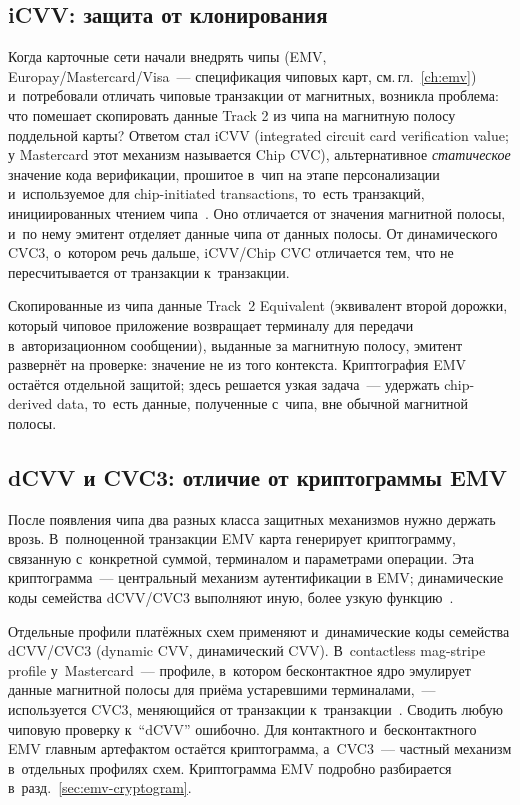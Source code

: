 \subsection*{iCVV: защита от клонирования}

Когда карточные сети начали внедрять чипы (EMV, Europay/Mastercard/Visa~---
спецификация чиповых карт, см.\,гл.~\ref{ch:emv}) и~потребовали отличать
чиповые транзакции от магнитных, возникла проблема:
что помешает скопировать данные Track 2 из чипа на магнитную полосу
поддельной карты? Ответом стал iCVV
(integrated circuit card verification value; у Mastercard этот
механизм называется Chip CVC), альтернативное \emph{статическое}
значение кода верификации, прошитое в~чип на этапе персонализации
и~используемое для chip-initiated transactions, то~есть транзакций,
инициированных чтением чипа~\cite{visa-vsdc-guide,mc-security-rules-2016}.
Оно отличается от значения магнитной полосы, и~по нему эмитент
отделяет данные чипа от данных полосы. От динамического CVC3,
о~котором речь дальше, iCVV/Chip CVC отличается тем, что
не пересчитывается от транзакции к~транзакции.

Скопированные из чипа данные Track~2 Equivalent (эквивалент второй
дорожки, который чиповое приложение возвращает терминалу для передачи
в~авторизационном сообщении), выданные за магнитную полосу, эмитент
развернёт на проверке: значение не из того контекста. Криптография
EMV остаётся отдельной защитой; здесь решается узкая задача~---
удержать chip-derived data, то~есть данные, полученные с~чипа, вне
обычной магнитной полосы.

\subsection*{dCVV и CVC3: отличие от криптограммы EMV}

После появления чипа два разных класса защитных механизмов нужно
держать врозь. В~полноценной транзакции EMV карта генерирует
криптограмму, связанную с~конкретной суммой, терминалом и параметрами
операции. Эта криптограмма~--- центральный механизм аутентификации
в EMV; динамические коды семейства dCVV/CVC3 выполняют иную, более
узкую функцию~\cite{emvco-book3}.

Отдельные профили платёжных схем применяют и~динамические коды
семейства dCVV/CVC3 (dynamic CVV, динамический CVV). В~contactless
mag-stripe profile у~Mastercard~--- профиле, в~котором бесконтактное
ядро эмулирует данные магнитной полосы для приёма устаревшими
терминалами,~--- используется CVC3, меняющийся от транзакции
к~транзакции~\cite{mc-contactless-security}.
Сводить любую чиповую проверку к~\enquote{dCVV} ошибочно. Для
контактного и~бесконтактного EMV главным артефактом остаётся криптограмма,
а~CVC3~--- частный механизм в~отдельных профилях схем. Криптограмма EMV
подробно разбирается в~разд.~\ref{sec:emv-cryptogram}.


